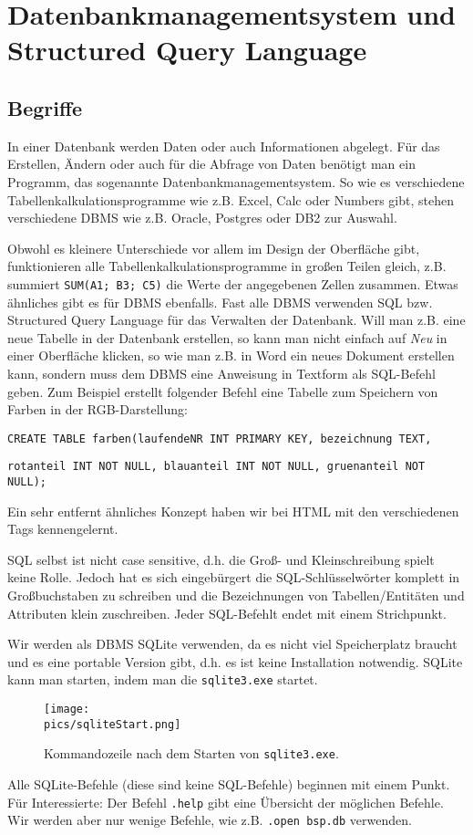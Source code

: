 \section[DBMS und SQL]{Datenbankmanagementsystem und Structured Query Language}
\subsection{Begriffe}
In einer Datenbank werden Daten oder auch Informationen abgelegt. Für das Erstellen, Ändern oder auch für die Abfrage von Daten benötigt man ein Programm, das sogenannte Datenbankmanagementsystem. So wie es verschiedene Tabellenkalkulationsprogramme wie z.B. Excel, Calc oder Numbers gibt, stehen  verschiedene DBMS wie z.B. Oracle, Postgres oder DB2 zur Auswahl.

Obwohl es kleinere Unterschiede vor allem im Design der Oberfläche gibt, funktionieren alle Tabellenkalkulationsprogramme in großen Teilen gleich, z.B. summiert \lstinline!SUM(A1; B3; C5)! die Werte der angegebenen Zellen zusammen. Etwas ähnliches gibt es für DBMS ebenfalls. Fast alle DBMS verwenden SQL bzw. Structured Query Language für das Verwalten der Datenbank. Will man z.B. eine neue Tabelle in der Datenbank erstellen, so kann man nicht einfach auf \textit{Neu} in einer Oberfläche klicken, so wie man z.B. in Word ein neues Dokument erstellen kann, sondern muss dem DBMS eine Anweisung in Textform als SQL-Befehl geben. Zum Beispiel erstellt folgender Befehl eine Tabelle zum Speichern von Farben in der RGB-Darstellung:

\lstinline!CREATE TABLE farben(laufendeNR INT PRIMARY KEY, bezeichnung TEXT,!

\lstinline!rotanteil INT NOT NULL, blauanteil INT NOT NULL, gruenanteil NOT NULL);!

Ein sehr entfernt ähnliches Konzept haben wir bei HTML mit den verschiedenen Tags kennengelernt.

SQL selbst ist nicht case sensitive, d.h. die Groß- und Kleinschreibung spielt keine Rolle. Jedoch hat es sich eingebürgert die SQL-Schlüsselwörter komplett in Großbuchstaben zu schreiben und die Bezeichnungen von Tabellen/Entitäten und Attributen klein zuschreiben. Jeder SQL-Befehlt endet mit einem Strichpunkt.

Wir werden als DBMS SQLite verwenden, da es nicht viel Speicherplatz braucht und es eine portable Version gibt, d.h. es ist keine Installation notwendig. SQLite kann man starten, indem man die \texttt{sqlite3.exe} startet.

\begin{figure}[h]
	\centering
	\texttt{[image: \\pics/sqliteStart.png]}
	\caption*{Kommandozeile nach dem Starten von \texttt{sqlite3.exe}.}
\end{figure}
Alle SQLite-Befehle (diese sind keine SQL-Befehle) beginnen mit einem Punkt. Für Interessierte: Der Befehl \lstinline!.help! gibt eine Übersicht der möglichen Befehle. Wir werden aber nur wenige Befehle, wie z.B. \lstinline!.open bsp.db! verwenden.